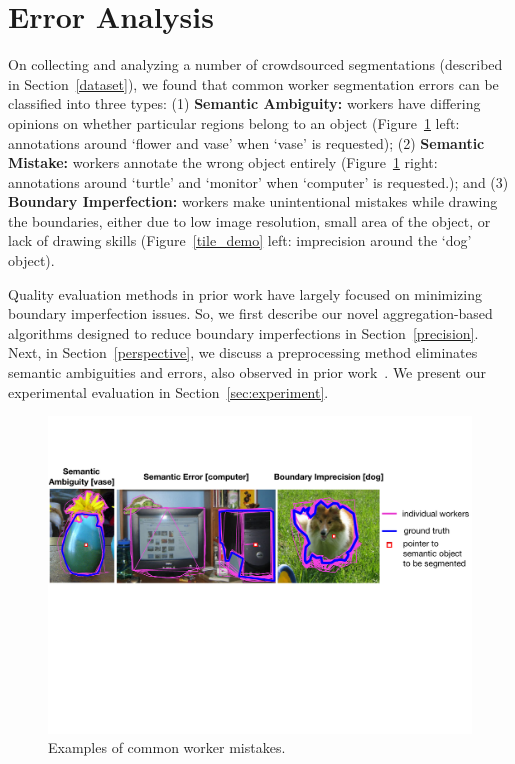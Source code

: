\documentclass[letterpaper]{article}
\begin{document}
\section{Error Analysis\label{sec:error}}
\par On collecting and analyzing a number of crowdsourced segmentations (described in Section~\ref{dataset}), we found that common worker segmentation errors can be classified into three types: (1) \textbf{Semantic Ambiguity:} workers have differing opinions on whether particular regions belong to an object (Figure~\ref{error_examples} left: annotations around `flower and vase' when `vase' is requested); (2) \textbf{Semantic Mistake:} workers annotate the wrong object entirely (Figure~\ref{error_examples} right: annotations around `turtle' and `monitor' when `computer' is requested.); and (3) \textbf{Boundary Imperfection:} workers make unintentional mistakes while drawing the boundaries, either due to low image resolution, small area of the object, or lack of drawing skills (Figure~\ref{tile_demo} left: imprecision around the `dog' object).
\par Quality evaluation methods in prior work have largely focused on minimizing boundary imperfection issues. So, we first describe our novel aggregation-based algorithms designed to reduce boundary imperfections in Section~\ref{precision}. Next, in Section~\ref{perspective}, we discuss a preprocessing method eliminates semantic ambiguities and errors, also observed in prior work~\cite{Sorokin2008,Lin2014,Gurari2018}. We present our experimental evaluation in Section~\ref{sec:experiment}.
\begin{figure}[h!]
    \centering
    \includegraphics[width=\linewidth]{plots/errors.pdf}
    \caption{Examples of common worker mistakes.}
    \label{error_examples}
\end{figure}
\end{document}
